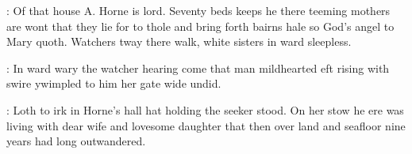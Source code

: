 \documentclass[12pt]{article}
\begin{document}

: Of that house A. Horne is lord. Seventy beds keeps he there teeming
mothers are wont that they lie for to thole and bring forth bairns hale so
God's angel to Mary quoth. Watchers tway there walk, white sisters in
ward sleepless.


: In ward wary the watcher hearing come that man mildhearted eft
rising with swire ywimpled to him her gate wide undid.



: Loth to irk in Horne's hall hat holding the seeker stood. On her stow
he ere was living with dear wife and lovesome daughter that then over land
and seafloor nine years had long outwandered.


\end{document}
